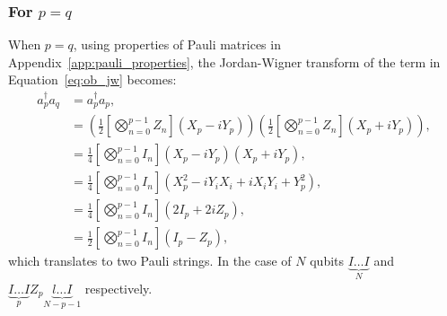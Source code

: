 \subsubsection{For $p=q$}%
\label{ssub:p_equal_q}
When $p=q$, using properties of Pauli matrices in Appendix~\ref{app:pauli_properties}, the Jordan-Wigner transform of the term in Equation~\eqref{eq:ob_jw} becomes:
\begin{equation}
	\label{eq:p_equals_q}
	\begin{aligned}
		a_{p}^{\dagger}a_q &= a_{p}^{\dagger}a_p,  \\
				   &= \left( \frac{1}{2} \left[ \bigotimes_{n=0}^{p-1} Z_n \right] \left( X_p - i Y_p \right)   \right) 
 \left( \frac{1}{2} \left[ \bigotimes_{n=0}^{p-1} Z_n \right] \left( X_p +i Y_p \right)   \right), \\
				   &= \frac{1}{4} \left[ \bigotimes_{n=0}^{p-1} I_n \right] \left( X_p - i Y_p \right) \left( X_p + i Y_p \right),\\ 
	&= \frac{1}{4} \left[ \bigotimes_{n=0}^{p-1} I_n \right] \left( X_p^2 -iY_iX_i + iX_iY_i + Y_p^2 \right), \\
	&= \frac{1}{4} \left[ \bigotimes_{n=0}^{p-1} I_n \right] \left( 2I_p + 2iZ_p \right), \\
	&= \frac{1}{2} \left[ \bigotimes_{n=0}^{p-1} I_n \right] \left( I_p -Z_p \right),
	\end{aligned}
\end{equation}
which translates to two Pauli strings. In the case of $ N $ qubits $\underbrace{I\ldots I}_N$ and $\underbrace{I\ldots I}_{p}Z_p \underbrace{l \ldots I}_{N-p-1}$ respectively.


